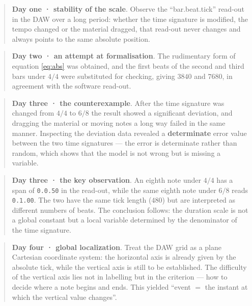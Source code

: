 \documentclass[11pt,a4paper]{article}
\newenvironment{quotedpassage}{\begin{quote}\small}{\end{quote}}
\begin{document}
\begin{quotedpassage}
\textbf{Day one · stability of the scale}. Observe the ``bar.beat.tick'' read-out in the
DAW over a long period: whether the time signature is modified, the tempo changed or the
material dragged, that read-out never changes and always points to the same absolute
position.
\end{quotedpassage}

\begin{quotedpassage}
\textbf{Day two · an attempt at formalisation}. The rudimentary form of equation
\eqref{eq:abs} was obtained, and the first beats of the second and third bars under
$4/4$ were substituted for checking, giving $3840$ and $7680$, in agreement with the
software read-out.
\end{quotedpassage}

\begin{quotedpassage}
\textbf{Day three · the counterexample}. After the time signature was changed from $4/4$
to $6/8$ the result showed a significant deviation, and dragging the material or moving
notes a long way failed in the same manner. Inspecting the deviation data revealed a
\textbf{determinate} error value between the two time signatures --- the error is
determinate rather than random, which shows that the model is not wrong but is missing a
variable.
\end{quotedpassage}

\begin{quotedpassage}
\textbf{Day three · the key observation}. An eighth note under $4/4$ has a span of
\texttt{0.0.50} in the read-out, while the same eighth note under $6/8$ reads
\texttt{0.1.00}. The two have the same tick length ($480$) but are interpreted as
different numbers of beats. The conclusion follows: the duration scale is not a global
constant but a local variable determined by the denominator of the time signature.
\end{quotedpassage}

\begin{quotedpassage}
\textbf{Day four · global localization}. Treat the DAW grid as a plane Cartesian
coordinate system: the horizontal axis is already given by the absolute tick, while the
vertical axis is still to be established. The difficulty of the vertical axis lies not
in labelling but in the criterion --- how to decide where a note begins and ends. This
yielded ``event $=$ the instant at which the vertical value changes''.
\end{quotedpassage}
\end{document}
